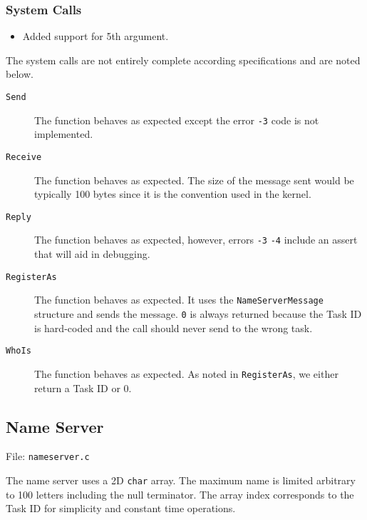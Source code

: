 \documentclass[letterpaper]{article}
\begin{document}
\subsubsection{System Calls%
  \label{system-calls}%
}
%
\begin{itemize}

\item Added support for 5th argument.

\end{itemize}

The system calls are not entirely complete according specifications and are noted below.
%
\begin{description}
\item[{\texttt{Send}}] \leavevmode 
The function behaves as expected except the error \texttt{-3} code is not implemented.

\item[{\texttt{Receive}}] \leavevmode 
The function behaves as expected. The size of the message sent would be typically 100 bytes since it is the convention used in the kernel.

\item[{\texttt{Reply}}] \leavevmode 
The function behaves as expected, however, errors \texttt{-3} \texttt{-4} include an assert that will aid in debugging.

\item[{\texttt{RegisterAs}}] \leavevmode 
The function behaves as expected. It uses the \texttt{NameServerMessage} structure and sends the message. \texttt{0} is always returned because the Task ID is hard-coded and the call should never send to the wrong task.

\item[{\texttt{WhoIs}}] \leavevmode 
The function behaves as expected. As noted in \texttt{RegisterAs}, we either return a Task ID or 0.

\end{description}


\subsection{Name Server%
  \label{name-server}%
}

File: \texttt{nameserver.c}

The name server uses a 2D \texttt{char} array. The maximum name is limited arbitrary to 100 letters including the null terminator. The array index corresponds to the Task ID for simplicity and constant time operations.
\end{document}
